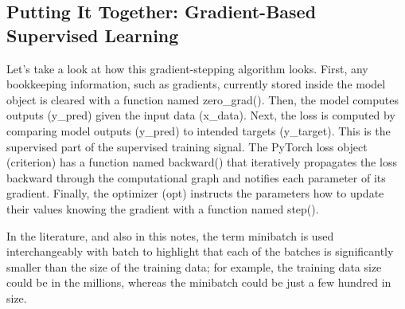 \subsection{Putting It Together: Gradient-Based Supervised Learning}
Let's take a look at how this gradient-stepping algorithm looks. First, any bookkeeping information, such as gradients, currently stored inside the model object is cleared with a function named zero\_grad(). Then, the model computes outputs (y\_pred) given the input data (x\_data). Next, the loss is computed by comparing model outputs (y\_pred) to intended targets (y\_target). This is the supervised part of the supervised training signal. The PyTorch loss object (criterion) has a function named backward() that iteratively propagates the loss backward through the computational graph and notifies each parameter of its gradient. Finally, the optimizer (opt) instructs the parameters how to update their values knowing the gradient with a
function named step().

\begin{tcolorbox}
    In the literature, and also in this notes, the term minibatch is used interchangeably with batch to highlight that each of the batches is significantly smaller than the size of the training data; for example, the training data size could be in the millions, whereas the minibatch could be just a few hundred in size.
\end{tcolorbox}